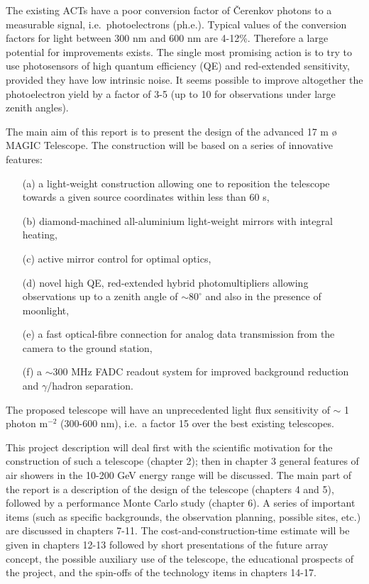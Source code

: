 The existing ACTs have a poor conversion factor of \v{C}erenkov photons to a
measurable signal, i.e.\ photoelectrons (ph.e.). 
Typical values of the conversion factors for light between
300 nm and 600 nm are 4-12\%. Therefore a large potential for improvements 
exists. The single most promising action is to 
try to use photosensors of high
quantum efficiency (QE) and red-extended sensitivity, provided they have
low intrinsic noise. It seems possible to  improve altogether the
photoelectron yield by a factor of 3-5 (up to 10 for observations under
large zenith angles).  

The main aim of this report is to present the design of the 
advanced 17 m {\o}
MAGIC Telescope. 
The construction will be based on a series of innovative features:

\begin{itemize}
\item[(a)]   a light-weight construction allowing one to reposition the
telescope towards a given source coordinates within less than 60 s,

\item[(b)]   diamond-machined all-aluminium light-weight
mirrors with integral heating,

\item[(c)]   active mirror control for optimal optics,

\item[(d)]   novel high QE, red-extended hybrid photomultipliers allowing
observations up to a zenith angle of $\sim 80^{\circ }$ 
and also in the presence of moonlight,

\item[(e)]   a fast optical-fibre connection for analog data transmission
from the camera to the ground station,

\item[(f)]   a $\sim$300 MHz FADC readout system for improved background 
reduction and $\gamma$/hadron separation.
\end{itemize}

The proposed telescope will have an unprecedented
light flux sensitivity of $\sim$ 1 photon m$^{-2}$  (300-600 nm), i.e.\ a factor 15
over the best existing telescopes.

This project description will deal first with  the scientific motivation for
the construction of such a telescope (chapter 2); 
then in chapter 3 general features of air showers in the
10-200 GeV energy range will be discussed. The main part of the report is a
description of the  design of the telescope (chapters 4 and 5), 
followed by a performance
Monte Carlo study (chapter 6). A series of important items (such as
specific backgrounds, the observation planning,
possible sites, etc.) are discussed in chapters 7-11.
The cost-and-construction-time estimate will be given in chapters 12-13
followed by short presentations of the future array concept,
the possible auxiliary use of the telescope, the educational
prospects of the project, and the spin-offs of the
technology items in chapters 14-17.

